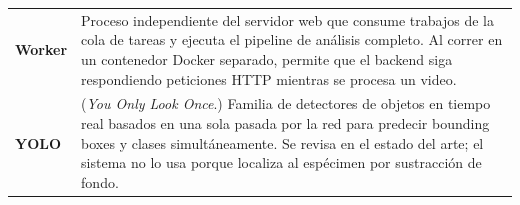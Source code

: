 \begin{longtable}{@{} p{4.0cm} p{10.9cm} @{}}
  \textbf{Worker}
  & Proceso independiente del servidor web que consume trabajos de la cola de
    tareas y ejecuta el pipeline de análisis completo. Al correr en un contenedor
    Docker separado, permite que el backend siga respondiendo peticiones HTTP
    mientras se procesa un video. \\[5pt]

  \textbf{YOLO}
  & (\textit{You Only Look Once}.) Familia de detectores de objetos en tiempo
    real basados en una sola pasada por la red para predecir bounding boxes y
    clases simultáneamente. Se revisa en el estado del arte; el sistema no lo
    usa porque localiza al espécimen por sustracción de fondo. \\[5pt]

\end{longtable}
